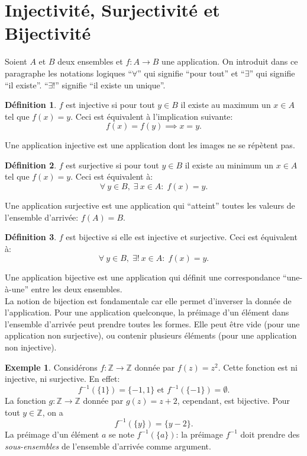 \documentclass[oneside,12pt,french,table]{book}
\newcommand{\Z}{\mathbb{Z}}
\theoremstyle{definition}
\theoremstyle{definition}
\newtheorem*{example}{Exemple}
\theoremstyle{definition}
\newtheorem{definition}{Définition}[chapter]
\begin{document}
\section{Injectivité, Surjectivité et Bijectivité}
Soient $A$ et $B$ deux ensembles et $f : A \longrightarrow B$ une application. On introduit dans ce paragraphe les notations logiques ``$\forall$'' qui signifie ``pour tout'' et ``$\exists$'' qui signifie ``il existe''. ``$\exists!$'' signifie ``il existe un unique''.
\begin{definition}
$f$ est injective si pour tout $y\in B$ il existe au maximum un $x\in A$ tel que $f(x)=y$. Ceci est équivalent à l'implication suivante: $$f(x)=f(y) \implies x=y.$$
\end{definition} 
\noindent Une application injective est une application dont les images ne se répètent pas.
\begin{definition}
$f$ est surjective si pour tout $y\in B$ il existe au minimum un $x\in A$ tel que $f(x)=y$. Ceci est équivalent à:
$$\forall \ y \in B, \; \exists \ x \in A : \; f(x)=y.$$
\end{definition}
\noindent Une application surjective est une application qui ``atteint'' toutes les valeurs de l'ensemble d'arrivée: $f(A) = B$.
\begin{definition}
$f$ est bijective si elle est injective et surjective. Ceci est équivalent à:
$$\forall \ y \in B, \; \exists! \ x \in A : \; f(x)=y.$$
\end{definition}
\noindent Une application bijective est une application qui définit une correspondance ``une-à-une'' entre les deux ensembles. \\
La notion de bijection est fondamentale car elle permet d'inverser la donnée de l'application. Pour une application quelconque, la préimage d'un élément dans l'ensemble d'arrivée peut prendre toutes les formes. Elle peut être vide (pour une application non surjective), ou contenir plusieurs éléments (pour une application non injective).
\begin{example}
Considérons $f : \Z \longrightarrow \Z$ donnée par $f(z) = z^2$. Cette fonction est ni injective, ni surjective. En effet:
$$f^{-1}(\{1\}) = \{-1,1\} \text{ et } f^{-1}( \{-1\}) = \emptyset.$$
La fonction $g: \Z \longrightarrow \Z$ donnée par $g(z)=z+2$, cependant, est bijective. Pour tout $y \in \Z$, on a $$f^{-1}(\{y\})= \{ y-2 \}.$$
La préimage d'un élément $a$ se note $f^{-1}(\{a\})$: la préimage $f^{-1}$ doit prendre des \textit{sous-ensembles} de l'ensemble d'arrivée comme argument.
\end{example}
\end{document}
